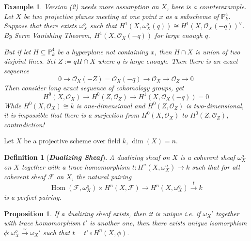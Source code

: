 \documentclass{ctexart}
\newtheorem{definition}{Definition}[section]
\newtheorem{proposition}{Proposition}[section]
\newtheorem{example}{Example}[section]
\renewcommand{\hom}{\operatorname{Hom}}
\begin{document}
\begin{example}
    Version (2) needs more assumption on $X$, here is a counterexample.
    Let $X$ be two projective planes meeting at one point $x$ as a subscheme of $\mathbb{P}_{k}^{4}$.
    Suppose that there exists $\omega_{X}^{o}$ such that $H^{1}(X, \omega_{X}^{o}(q)) \cong H^{1}(X, \mathcal{O}_{X}(-q))^{\lor}$.
    By Serre Vanishing Theorem, $H^{1}(X, \mathcal{O}_{X}(-q))$ for large enough $q$.
    \par
    But if let $H \subseteq \mathbb{P}_{k}^{4}$ be a hyperplane not containing $x$, then $H \cap X$ is union of two disjoint lines.
    Set $Z := qH \cap X$ where $q$ is large enough.
    Then there is an exact sequence
    \begin{equation*}
        0 \longrightarrow \mathcal{O}_{X}(-Z) = \mathcal{O}_{X}(-q) \longrightarrow \mathcal{O}_{X} \longrightarrow \mathcal{O}_{Z} \longrightarrow 0
    \end{equation*}
    Then consider long exact sequence of cohomology groups, get 
    \begin{equation*}
        H^{0}(X, \mathcal{O}_{X}) \longrightarrow H^{0}(Z, \mathcal{O}_{Z}) \longrightarrow H^{1}(X, \mathcal{O}_{X}(-q)) = 0
    \end{equation*}
    While $H^{0}(X, \mathcal{O}_{X}) \cong k$ is one-dimensional and $H^{0}(Z, \mathcal{O}_{Z})$ is two-dimensional, 
    it is impossible that there is a surjection from $H^{0}(X, \mathcal{O}_{X})$ to $H^{0}(Z, \mathcal{O}_{Z})$, contradiction!
\end{example}
Let $X$ be a projective scheme over field $k$, $\dim(X) = n$.
\begin{definition}[\textbf{\emph{Dualizing Sheaf}}]
    A dualizing sheaf on $X$ is a coherent sheaf $\omega_{X}^{o}$ on $X$ together with a trace homomorphism $t: H^{n}(X, \omega_{X}^{o}) \longrightarrow k$ such that for all coherent sheaf $\mathcal{F}$ on $X$, the natural pairing 
    \begin{equation*}
        \hom(\mathcal{F}, \omega_{X}^{o}) \times H^{n}(X, \mathcal{F}) \longrightarrow H^{n}(X, \omega_{X}^{o}) \overset{t}{\longrightarrow} k
    \end{equation*}
    is a perfect pairing.
\end{definition}
\begin{proposition}
    If a dualizing sheaf exists, then it is unique i.e. if $\omega_{X}'$ together with trace homomorphism $t'$ is another one,
    then there exists unique isomorphism $\phi: \omega_{X}^{o} \overset{\sim}{\longrightarrow} \omega_{X}'$ such that $t = t' \circ H^{n}(X, \phi)$.
    \label{Proposition 11.8}
\end{proposition}
\end{document}
